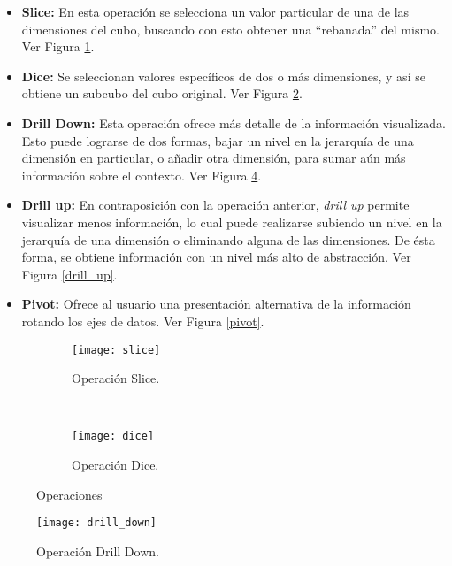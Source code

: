 \documentclass[a4paper,11pt]{article}
\begin{document}
    \begin{itemize}
      \item \textbf{Slice:} En esta operación se selecciona un valor particular de una de las dimensiones del cubo, buscando con esto obtener una ``rebanada'' del
      mismo. Ver Figura \ref{slice}.
      \item \textbf{Dice:} Se seleccionan valores específicos de dos o más dimensiones, y así se obtiene un subcubo del cubo original. Ver Figura \ref{dice}.
      \item \textbf{Drill Down:} Esta operación ofrece más detalle de la información visualizada. Esto puede
      lograrse de dos formas, bajar un nivel en la jerarquía de una dimensión en particular, o añadir otra dimensión, para sumar aún más información sobre el contexto.
      Ver Figura \ref{drill_down}.
      \item \textbf{Drill up:} En contraposición con la operación anterior, \textit{drill up} permite visualizar menos información, lo cual puede realizarse
      subiendo un nivel en la jerarquía de una dimensión o eliminando alguna de las dimensiones. De ésta forma, se obtiene información con un nivel más alto
      de abstracción. Ver Figura \ref{drill_up}.
      \item \textbf{Pivot:} Ofrece al usuario una presentación alternativa de la información rotando los ejes de datos. Ver Figura \ref{pivot}.
    \end{itemize}
    
    \begin{figure}
        \centering
        \begin{subfigure}[b]{0.5\textwidth}
          \texttt{[image: slice]}
          \caption{Operación Slice. \cite{operaciones}}
          \label{slice}      
        \end{subfigure}%
        ~
        \begin{subfigure}[b]{0.5\textwidth}
          \texttt{[image: dice]}
          \caption{Operación Dice. \cite{operaciones}}
          \label{dice}
        \end{subfigure}
    \caption{
    \label{slice-dice}%
    Operaciones}
    \end{figure}
      
    \begin{figure}
      \begin{center}
        \texttt{[image: drill\_down]}
        \caption{Operación Drill Down. \cite{operaciones}}
        \label{drill_down}
      \end{center}
    \end{figure}
    
\end{document}
